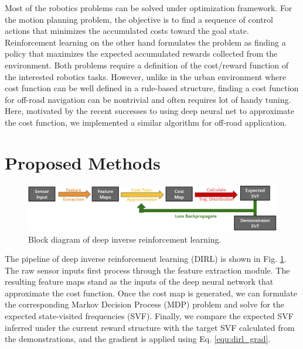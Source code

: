 \documentclass[../thesis.tex]{subfiles}
\begin{document}

Most of the robotics problems can be solved under optimization framework. 
For the motion planning problem, the objective is to find a sequence of control actions that minimizes the accumulated costs toward the goal state. 
Reinforcement learning on the other hand formulates the problem as finding a policy that maximizes the expected accumulated rewards collected from the environment. 
Both problems require a definition of the cost/reward function of the interested robotics tasks.
However, unlike in the urban environment where cost function can be well defined in a rule-based structure, finding a cost function for off-road navigation can be nontrivial and often requires lot of handy tuning. \cite{silver2010learning}
Here, motivated by the recent successes \cite{wulfmeier2015maximum,wulfmeier2016watch} to using deep neural net to approximate the cost function, we implemented a similar algorithm for off-road application. 


\section{Proposed Methods}

\begin{figure}[t]
	\begin{center}
		\centerline{\includegraphics[width=\columnwidth]{./DIRL/fig/dirl_diagram.png}}
		\caption{Block diagram of deep inverse reinforcement learning.}
		\label{fig:dirl_diagram}
	\end{center}
\end{figure} 

The pipeline of deep inverse reinforcement learning (DIRL) is shown in Fig. \ref{fig:dirl_diagram}. 
The raw sensor inputs first process through the feature extraction module. 
The resulting feature maps stand as the inputs of the deep neural network that approximate the cost function.
Once the cost map is generated, we can formulate the corresponding Markov Decision Process (MDP) problem and solve for the expected state-visited frequencies (SVF).
Finally, we compare the expected SVF inferred under the current reward structure with the target SVF calculated from the demonstrations, and the gradient is applied using Eq. \ref{equ:dirl_grad}. 
\end{document}
